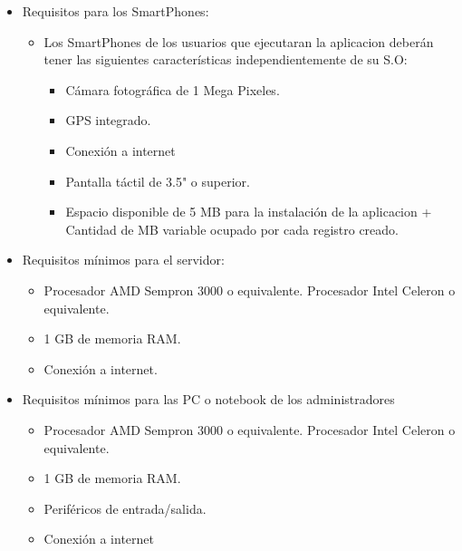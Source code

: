             \begin{itemize}
                \item Requisitos para los SmartPhones:
                \begin{itemize}
                    \item Los SmartPhones de los usuarios que ejecutaran la aplicacion deberán tener las siguientes características independientemente de su S.O:
                    \begin{itemize}
                        \item Cámara fotográfica de 1 Mega Pixeles.
                        \item GPS integrado.
                        \item Conexión a internet
                        \item Pantalla táctil de 3.5" o superior.
                        \item Espacio disponible de 5 MB para la instalación de la aplicacion + Cantidad de MB variable ocupado por cada registro creado. 
                    \end{itemize}
                \end{itemize}
                \item Requisitos mínimos para el servidor:
                \begin{itemize}
                    \item Procesador AMD Sempron 3000 o equivalente.  Procesador Intel Celeron o equivalente.
                    \item 1 GB de memoria RAM.
                    \item Conexión a internet.
                \end{itemize}
                \item Requisitos mínimos para las PC o notebook de los administradores
                \begin{itemize}
                    \item Procesador AMD Sempron 3000 o equivalente. Procesador Intel Celeron o equivalente.
                    \item 1 GB de memoria RAM.
                    \item Periféricos de entrada/salida.
                    \item Conexión a internet
                \end{itemize}
            \end{itemize}
            

